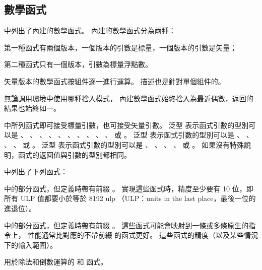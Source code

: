 \subsection[sec:mathFunc]{數學函式}

中列出了內建的數學函式。
內建的數學函式分為兩種：
\startigBase
\item 第一種函式有兩個版本，一個版本的引數是標量，一個版本的引數是矢量；

\item 第二種函式只有一個版本，引數為標量浮點數。
\stopigBase

矢量版本的數學函式按組件逐一進行運算。
描述也是針對單個組件的。

無論調用環境中使用哪種捨入模式，
內建數學函式始終捨入為最近偶數，返回的結果也始終如一。

中所列函式即可接受標量引數，也可接受矢量引數。
泛型  表示函式引數的型別可以是
 、 、 、 、
 、 、 、 、
 、 、  或 。
泛型  表示函式引數的型別可以是
 、 、 、 、
  或 。
泛型  表示函式引數的型別可以是
 、 、 、 、
  或 。
如果沒有特殊說明，函式的返回值與引數的型別都相同。

{}

中列出了下列函式：
\startigBase
\item {}中的部分函式，但定義時帶有前綴 。
實現這些函式時，精度至少要有 10 位，即所有 ULP 值都要小於等於 8192 ulp
（ULP：units in the last place，最後一位的進退位）。

\item {}中的部分函式，但定義時帶有前綴 。
這些函式可能會映射到一條或多條原生的指令上，
性能通常比對應的不帶前綴  的函式更好。
這些函式的精度（以及某些情況下的輸入範圍）。

\item 用於除法和倒數運算的  和  函式。
\stopigBase

